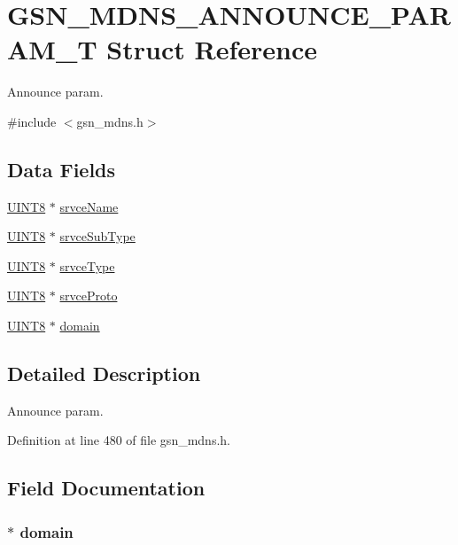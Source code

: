 \hypertarget{a00141}{
\section{GSN\_\-MDNS\_\-ANNOUNCE\_\-PARAM\_\-T Struct Reference}
\label{a00141}
}


Announce param.  




{\ttfamily \#include $<$gsn\_\-mdns.h$>$}

\subsection*{Data Fields}
\begin{DoxyCompactItemize}
\item 
\hyperlink{a00660_gab27e9918b538ce9d8ca692479b375b6a}{UINT8} $\ast$ \hyperlink{a00141_a04b7b35934b06d9d838a42dc302525c4}{srvceName}
\item 
\hyperlink{a00660_gab27e9918b538ce9d8ca692479b375b6a}{UINT8} $\ast$ \hyperlink{a00141_a1abfc1470aad0566d2bd0f9566dced35}{srvceSubType}
\item 
\hyperlink{a00660_gab27e9918b538ce9d8ca692479b375b6a}{UINT8} $\ast$ \hyperlink{a00141_ae936821f0b28aba244cd7270eab50b96}{srvceType}
\item 
\hyperlink{a00660_gab27e9918b538ce9d8ca692479b375b6a}{UINT8} $\ast$ \hyperlink{a00141_a9dd2986de2728362170d70c3a10d605c}{srvceProto}
\item 
\hyperlink{a00660_gab27e9918b538ce9d8ca692479b375b6a}{UINT8} $\ast$ \hyperlink{a00141_a3498b70cb998dd924ec4aea5780b9696}{domain}
\end{DoxyCompactItemize}


\subsection{Detailed Description}
Announce param. 

Definition at line 480 of file gsn\_\-mdns.h.



\subsection{Field Documentation}
\hypertarget{a00141_a3498b70cb998dd924ec4aea5780b9696}{
\subsubsection[{domain}]{$\ast$ {\bf domain}}}
\label{a00141_a3498b70cb998dd924ec4aea5780b9696}


